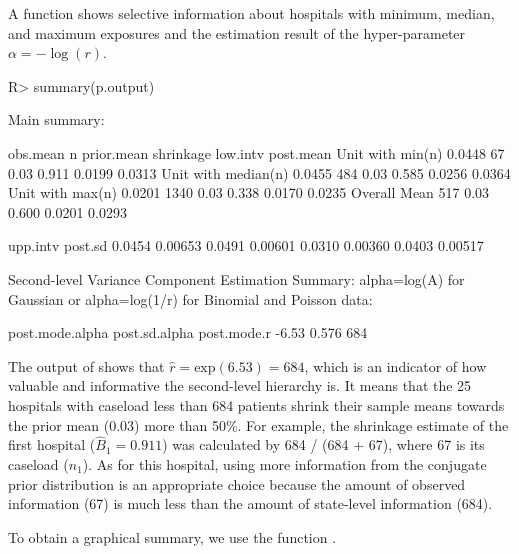 \documentclass[article]{jss}
\begin{document}
A function  shows selective information about hospitals with minimum, median, and maximum exposures and the estimation result of the hyper-parameter $\alpha=-\log(r)$.  \begin{CodeChunk}
\begin{CodeInput}
R> summary(p.output)
\end{CodeInput}
\begin{CodeOutput}
Main summary:

                    obs.mean    n prior.mean shrinkage low.intv post.mean
Unit with min(n)      0.0448   67       0.03     0.911   0.0199    0.0313   
Unit with median(n)   0.0455  484       0.03     0.585   0.0256    0.0364   
Unit with max(n)      0.0201 1340       0.03     0.338   0.0170    0.0235   
Overall Mean                  517       0.03     0.600   0.0201    0.0293   

                    upp.intv  post.sd
                      0.0454  0.00653
                      0.0491  0.00601
                      0.0310  0.00360
                      0.0403  0.00517

Second-level Variance Component Estimation Summary:
alpha=log(A) for Gaussian or alpha=log(1/r) for Binomial and Poisson data:

post.mode.alpha post.sd.alpha post.mode.r
          -6.53         0.576         684
\end{CodeOutput}
\end{CodeChunk}
The output of  shows that $\hat{r}=\textrm{exp}(6.53)=684$, which is an indicator of how valuable and informative the second-level hierarchy is. It means that the 25 hospitals with caseload less than 684 patients shrink their sample means towards the prior mean (0.03) more than 50\%. For example, the shrinkage estimate of the first hospital ($\hat{B}_{1}= 0.911$) was calculated by 684 / (684 + 67), where 67 is its caseload ($n_{1}$). As for this hospital, using more information from the conjugate prior distribution is an appropriate choice because the amount  of observed information (67) is much less than the amount of state-level information (684).


To obtain a graphical summary, we use the function .%
\end{document}
